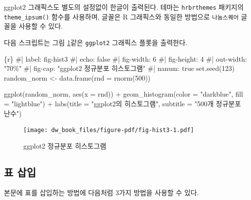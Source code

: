 \documentclass[
  letterpaper,
]{book}
\newenvironment{Shaded}{\begin{snugshade}}{\end{snugshade}}
\newcommand{\InformationTok}[1]{\textcolor[rgb]{0.37,0.37,0.37}{#1}}
\begin{document}
ggplot2 그래픽스도 별도의 설정없이 한글이 출력된다. 테마는
\texttt{hrbrthemes} 패키지의
\texttt{theme\_ipsum()} 함수를 사용하며, 글꼴은 R
그래픽스와 동일한 방법으로 \texttt{나눔스퀘어} 글꼴을 사용할 수 있다.

다음 스크립트는 그림 \ref{fig-hist3}\과 같은
\texttt{ggplot2} 그래픽스 플롯을 출력한다.

\begin{Shaded}
\begin{Highlighting}[]
\InformationTok{\textasciigrave{}\textasciigrave{}\textasciigrave{}\{r\}}
\InformationTok{\#| label: fig{-}hist3}
\InformationTok{\#| echo: false}
\InformationTok{\#| fig{-}width: 6}
\InformationTok{\#| fig{-}height: 4}
\InformationTok{\#| out{-}width: "70\%"}
\InformationTok{\#| fig{-}cap: "ggplot2 정규분포 히스토그램"}
\InformationTok{\#| nanum: true}
\InformationTok{set.seed(123)}
\InformationTok{random\_norm \textless{}{-} data.frame(rnd = rnorm(500))}

\InformationTok{ggplot(random\_norm, aes(x = rnd)) +}
\InformationTok{  geom\_histogram(color = "darkblue", fill = "lightblue") +}
\InformationTok{  labs(title = "ggplot2의 히스토그램",}
\InformationTok{       subtitle = "500개 정규분포 난수")}
\InformationTok{\textasciigrave{}\textasciigrave{}\textasciigrave{}}
\end{Highlighting}
\end{Shaded}

\begin{figure}

{\centering \texttt{[image: dw\_book\_files/figure-pdf/fig-hist3-1.pdf]}

}

\caption{\label{fig-hist3}ggplot2 정규분포 히스토그램}

\end{figure}

\hypertarget{uxd45c-uxc0bduxc785}{%
\subsection{표 삽입}\label{uxd45c-uxc0bduxc785}}

본문에 표를 삽입하는 방법에 다음처럼 3가지 방법을 사용할 수 있다.
\end{document}
